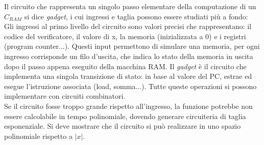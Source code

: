 Il circuito che rappresenta un singolo passo elementare della computazione di un $C_{RAM}$ si dice \emph{gadget}, i cui ingressi e taglia possono essere studiati più a fondo: 
\\
Gli ingressi al primo livello del circuito sono valori precisi che rappresentano: il codice del verificatore, il valore di x, la memoria (inizializzata a 0) e i registri (program counter...). Questi input permettono di simulare una memoria, per ogni ingresso corrisponde un filo d'uscita, che indica lo stato della memoria in uscita dopo il passo appena eseguito della macchina RAM. Il \emph{gadget} è il circuito che implementa una singola transizione di stato: in base al valore del PC, estrae ed esegue l'istruzione associata (load, somma...). Tutte queste operazioni si possono implementare con circuiti combinatori.
\\
Se il circuito fosse troppo grande rispetto all'ingresso, la funzione potrebbe non essere calcolabile in tempo polinomiale, dovendo generare circuiteria di taglia esponenziale. Si deve mostrare che il circuito si può realizzare in uno spazio polinomiale rispetto a $|x|$.

